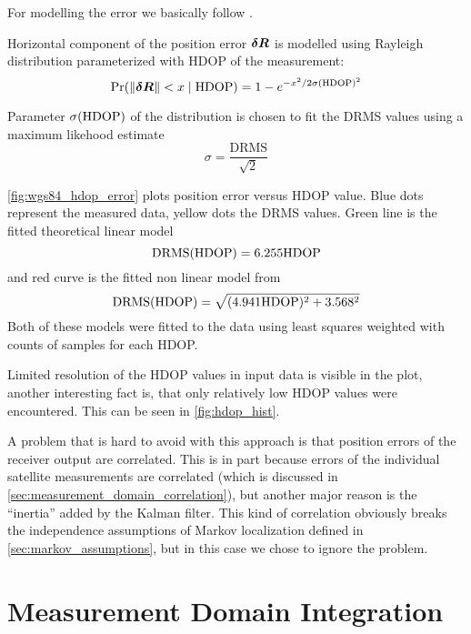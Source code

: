 For modelling the error we basically follow \cite{www-wilson}.

Horizontal component of the position error  \(\bm{\delta R}\) is modelled using Rayleigh distribution
parameterized with HDOP of the measurement:
\begin{equation}
	\operatorname{\mathrm{Pr}}(\lVert\bm{\delta R}\rVert < x \mid \mathrm{HDOP}) =
		1 - e^{-x^2/2\sigma(\mathrm{HDOP})^2}
\end{equation}

Parameter \(\sigma(\mathrm{HDOP})\) of the distribution is chosen to fit the DRMS values using a maximum likehood estimate
\begin{equation}
	\sigma = \frac{\mathrm{DRMS}}{\sqrt{2}}
\end{equation}

\autoref{fig:wgs84_hdop_error} plots position error versus HDOP value.
Blue dots represent the measured data, yellow dots the DRMS values.
Green line is the fitted theoretical linear model
\begin{equation}
\mathrm{DRMS}(\mathrm{HDOP}) = \num{6.255} \mathrm{HDOP}
\end{equation}
and red curve is the fitted non linear model from \cite{www-wilson}
\begin{equation}
\mathrm{DRMS}(\mathrm{HDOP}) = \sqrt{(\num{4.941}\mathrm{HDOP})^2 + \num{3.568}^2}
\end{equation}
Both of these models were fitted to the data using least squares weighted with counts of samples
for each HDOP.

Limited resolution of the HDOP values in input data is visible in the plot,
another interesting fact is, that only relatively low HDOP values were encountered.
This can be seen in \autoref{fig:hdop_hist}.

A problem that is hard to avoid with this approach is that position errors of the
receiver output are correlated.
This is in part because errors of the individual satellite measurements are correlated
(which is discussed in \ref{sec:measurement_domain_correlation}), but another major reason
is the \enquote{inertia} added by the Kalman filter.
This kind of correlation obviously breaks the independence assumptions of Markov
localization defined in \ref{sec:markov_assumptions}, but in this case we chose to ignore
the problem. 

\section{Measurement Domain Integration}
\label{sec:measurement_domain}

